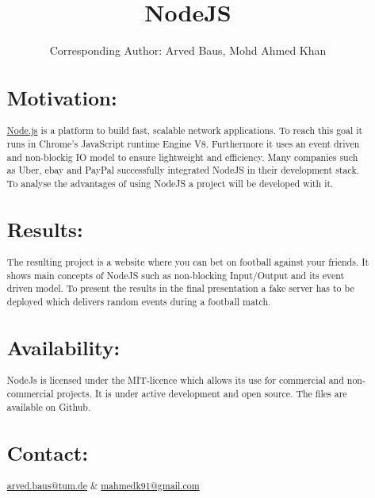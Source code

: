 \documentclass{bioinfo}
\begin{document}

\title[short Title]{NodeJS}
\author[Sample \textit{et~al}]{Corresponding Author: Arved Baus, Mohd Ahmed Khan	}

\address{Department of XXXXXXX, Address XXXX }



\maketitle

\begin{abstract}

\section{Motivation:}
\href{www.nodejs.org}{Node.js} is a platform to build fast, scalable network applications. To reach this goal it runs in Chrome's JavaScript runtime Engine V8. Furthermore it uses an event driven and non-blockig IO model to ensure lightweight and efficiency. Many companies such as Uber, ebay and PayPal successfully integrated NodeJS in their development stack. To analyse the advantages of using NodeJS a project will be developed with it. 

\section{Results:}
The resulting project is a website where you can bet on football against your friends. It shows main concepts of NodeJS such as non-blocking Input/Output and its event driven model. To present the results in the final presentation a fake server has to be deployed which delivers random events during  a football match. 

\section{Availability:} NodeJs is licensed under the MIT-licence which allows its use for commercial and non-commercial projects. It is under active development and open source. The files are available on Github.

\section{Contact:} \href{arved.baus@tum.de}{arved.baus@tum.de} \&  \href{mahmedk91@gmail.com}{mahmedk91@gmail.com}
\end{abstract}
\end{document}

